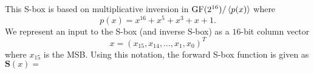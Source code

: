 This S-box is based on multiplicative inversion in $\mathrm{GF}(2^{16}) / \left\langle p(x) \right\rangle$ where 
\begin{equation*}
p(x) = x^{16} + x^5 + x^3 + x + 1.
\end{equation*}
We represent an input to the S-box (and inverse S-box) as a $16$-bit column vector 
\begin{equation*}
x = ( x_{15}, x_{14}, \ldots, x_1, x_0 )^T
\end{equation*}
where $x_{15}$ is the MSB.
Using this notation, the forward S-box function is given as $\mathbf{S}(x) =$
\small
